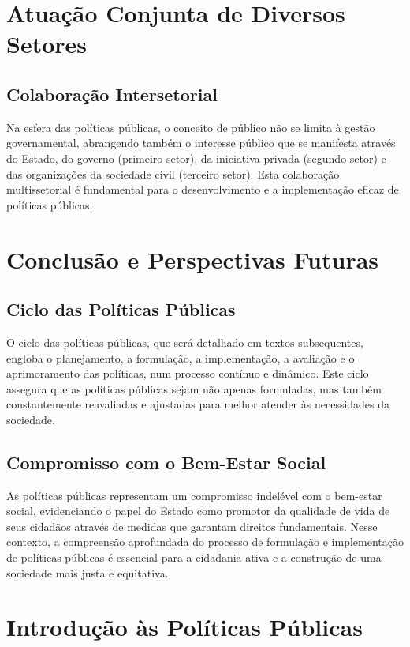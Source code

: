 \documentclass[
   article,       
   12pt,          
   oneside,       
   a4paper,       
   english,       
   brazil,        
   sumario=tradicional
   ]{abntex2}
\begin{document}
\section{Atuação Conjunta de Diversos Setores}
\subsection{Colaboração Intersetorial}
Na esfera das políticas públicas, o conceito de público não se limita à gestão governamental, abrangendo também o interesse público que se manifesta através do Estado, do governo (primeiro setor), da iniciativa privada (segundo setor) e das organizações da sociedade civil (terceiro setor). Esta colaboração multissetorial é fundamental para o desenvolvimento e a implementação eficaz de políticas públicas.

\section{Conclusão e Perspectivas Futuras}
\subsection{Ciclo das Políticas Públicas}
O ciclo das políticas públicas, que será detalhado em textos subsequentes, engloba o planejamento, a formulação, a implementação, a avaliação e o aprimoramento das políticas, num processo contínuo e dinâmico. Este ciclo assegura que as políticas públicas sejam não apenas formuladas, mas também constantemente reavaliadas e ajustadas para melhor atender às necessidades da sociedade.

\subsection{Compromisso com o Bem-Estar Social}
As políticas públicas representam um compromisso indelével com o bem-estar social, evidenciando o papel do Estado como promotor da qualidade de vida de seus cidadãos através de medidas que garantam direitos fundamentais. Nesse contexto, a compreensão aprofundada do processo de formulação e implementação de políticas públicas é essencial para a cidadania ativa e a construção de uma sociedade mais justa e equitativa.
\section{Introdução às Políticas Públicas}
\end{document}
